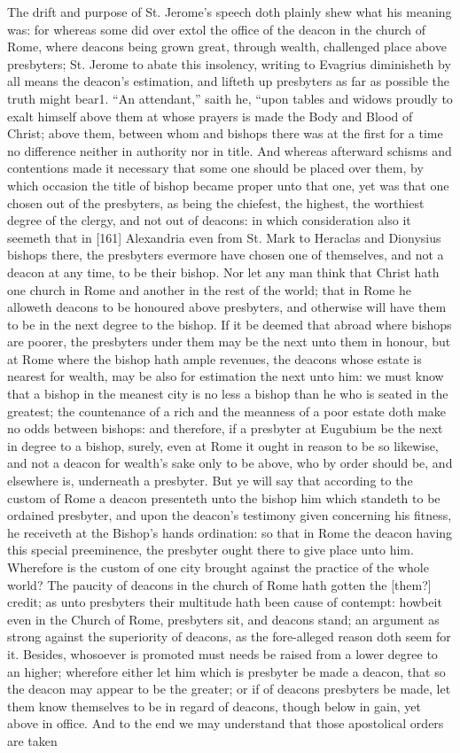 The drift and purpose of St. Jerome’s speech doth plainly shew what his meaning was: for whereas some did over extol the office of the deacon in the church of Rome, where deacons being grown great, through wealth, challenged place above presbyters; St. Jerome to abate this insolency, writing to Evagrius diminisheth by all means the deacon’s estimation, and lifteth up presbyters as far as possible the truth might bear1. “An attendant,” saith he, “upon tables and widows proudly to exalt himself above them at whose prayers is made the Body and Blood of Christ; above them, between whom and bishops there was at the first for a time no difference neither in authority nor in title. And whereas afterward schisms and contentions made it necessary that some one should be placed over them, by which occasion the title of bishop became proper unto that one, yet was that one chosen out of the presbyters, as being the chiefest, the highest, the worthiest degree of the clergy, and not out of deacons: in which consideration also it seemeth that in [161] Alexandria even from St. Mark to Heraclas and Dionysius bishops there, the presbyters evermore have chosen one of themselves, and not a deacon at any time, to be their bishop. Nor let any man think that Christ hath one church in Rome and another in the rest of the world; that in Rome he alloweth deacons to be honoured above presbyters, and otherwise will have them to be in the next degree to the bishop. If it be deemed that abroad where bishops are poorer, the presbyters under them may be the next unto them in honour, but at Rome where the bishop hath ample revenues, the deacons whose estate is nearest for wealth, may be also for estimation the next unto him: we must know that a bishop in the meanest city is no less a bishop than he who is seated in the greatest; the countenance of a rich and the meanness of a poor estate doth make no odds between bishops: and therefore, if a presbyter at Eugubium be the next in degree to a bishop, surely, even at Rome it ought in reason to be so likewise, and not a deacon for wealth’s sake only to be above, who by order should be, and elsewhere is, underneath a presbyter. But ye will say that according to the custom of Rome a deacon presenteth unto the bishop him which standeth to be ordained presbyter, and upon the deacon’s testimony given concerning his fitness, he receiveth at the Bishop’s hands ordination: so that in Rome the deacon having this special preeminence, the presbyter ought there to give place unto him. Wherefore is the custom of one city brought against the practice of the whole world? The paucity of deacons in the church of Rome hath gotten the [them?] credit; as unto presbyters their multitude hath been cause of contempt: howbeit even in the Church of Rome, presbyters sit, and deacons stand; an argument as strong against the superiority of deacons, as the fore-alleged reason doth seem for it. Besides, whosoever is promoted must needs be raised from a lower degree to an higher; wherefore either let him which is presbyter be made a deacon, that so the deacon may appear to be the greater; or if of deacons presbyters be made, let them know themselves to be in regard of deacons, though below in gain, yet above in office. And to the end we may understand that those apostolical orders are taken 